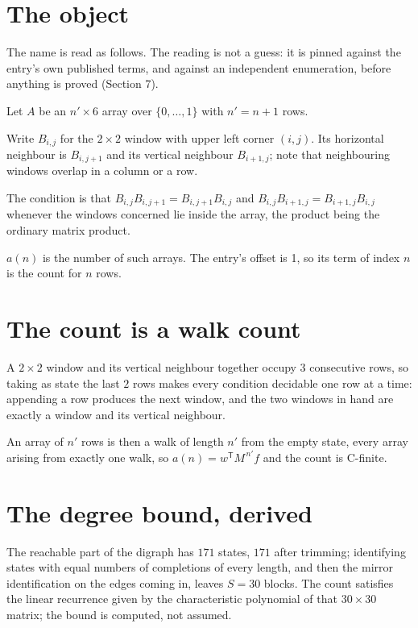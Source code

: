 \documentclass[11pt]{article}
\theoremstyle{definition}
\begin{document}
\section{The object}

The name is read as follows. The reading is not a guess: it is pinned against the entry's own published terms, and against an independent enumeration, before anything is proved (Section 7).

Let $A$ be an $n' \times 6$ array over $\{0,\dots,1\}$ with $n' = n + 1$ rows.

Write $B_{i,j}$ for the $2\times2$ window with upper left corner $(i,j)$. Its horizontal neighbour is $B_{i,j+1}$ and its vertical neighbour $B_{i+1,j}$; note that neighbouring windows overlap in a column or a row.

The condition is that $B_{i,j}B_{i,j+1} = B_{i,j+1}B_{i,j}$ and $B_{i,j}B_{i+1,j} = B_{i+1,j}B_{i,j}$ whenever the windows concerned lie inside the array, the product being the ordinary matrix product.

$a(n)$ is the number of such arrays. The entry's offset is 1, so its term of index $n$ is the count for $n$ rows.

\section{The count is a walk count}

A $2\times2$ window and its vertical neighbour together occupy $3$ consecutive rows, so taking as state the last $2$ rows makes every condition decidable one row at a time: appending a row produces the next window, and the two windows in hand are exactly a window and its vertical neighbour.

An array of $n'$ rows is then a walk of length $n'$ from the empty state, every array arising from exactly one walk, so $a(n) = w^{\mathsf T}M^{\,n'}f$ and the count is C-finite.

\section{The degree bound, derived}

The reachable part of the digraph has $171$ states, $171$ after trimming; identifying states with equal numbers of completions of every length, and then the mirror identification on the edges coming in, leaves $S = 30$ blocks. The count satisfies the linear recurrence given by the characteristic polynomial of that $30\times30$ matrix; the bound is computed, not assumed.
\end{document}
